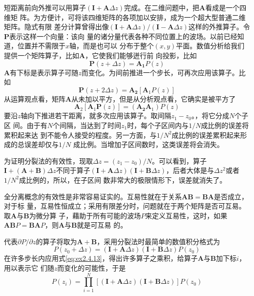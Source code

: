 短距离前向外推可以用算子$(\mathbf{I}+\mathbf{A}\Delta z)$完成。在二维问题中，把$\mathbf{A}$看成是一个四维矩
阵。为方便计，可将该四维矩阵的各项加以安排，成为一个超大型普通二维矩阵。隐式有限
差分计算曾得出像$(\mathbf{I}+\mathbf{A}\Delta z)/(\mathbf{I}-\mathbf{A}\Delta z)$这样的外推算子。令$\mathbf{P}$表示这样一个向量：该向
量的诸分量代表各种不同位置上的波场。以前已经知道，位置并不需限于$x$轴，而是也可以
分布于整个$(x,y)$平面。数值分析给我们提供一个矩阵算子，比如$\mathbf{A}$，它使我们能够迸行前
向投影，比如
\begin{equation*}
\mathbf{P}(z+\Delta z)=\mathbf{A_1}P(z)
\end{equation*}
$\mathbf{A}$有下标是表示算子可随$z$而变化。为间前推进一个步长，可再次应用该算子。比如
\begin{equation*}
\mathbf{P}(z+2\Delta z)=\mathbf{A_2}[\mathbf{A}_1P(z)]
\end{equation*}
从运算观点看，矩阵$\mathbf{A}$从未加以平方，但是从分析观点看，它确实是被平方了
\begin{equation*}
\mathbf{A}_2[\mathbf{A}_1\mathbf{P}(z)]=(\mathbf{A_2}\mathbf{A}_1)P(z)
\end{equation*}
要沿$z$轴向下推进若干距离，就多次应用该算子。取间隔$z_1-z_0$。，将它分成$N$个子区
间。由于有$N$个间隔，当达到了时间$z_1$时，每个子区间内与$1/N$成比例的误差将累积起来达
到不能令人接受的程度。另一方面，与$1/N^2$成比例的误差累积起来形成的总误差却仅与$1/N$
成比例。当增加子区间数时，这类误差将会消失。

为证明分裂法的有效性，现取$\Delta z=(z_1-z_0)/N$。可以看到，算子$\mathbf{I}+(\mathbf{A}+\mathbf{B})\Delta z$不同于算子$(\mathbf{I}+\mathbf{A}\Delta z)(\mathbf{I}+\mathbf{B}\Delta z)$，后者大体是与$\Delta z^2$或者$1/N^2$成比例的，所以，在子区间
数非常大的极限情形下，误差就消失了。

全分离概念的有效性是非常容易证实的。互易性就在于关系$\mathbf{AB}=
\mathbf{BA}$是否成立，对于标
量，互易性恒成立；采用有限差分时，问题就在于两个矩阵是否可互易。取$\mathbf{A}$与$\mathbf{B}$为微分算
子，藉助于所有可能的波场$P$来定义互易性，这时，如果$\mathbf{AB}P=\mathbf{BA}P$，则$\mathbf{A}$与$\mathbf{B}$就是可互易
的。

代表$\partial P/\partial z$的算子将取为$\mathbf{A}+\mathbf{B}$，采用分裂法时最简单的数值积分格式为
\begin{equation}
P(z_0+\Delta z)=(\mathbf{I}+\mathbf{A}\Delta z)(\mathbf{I}+\mathbf{B}\Delta z)P(z_0)
\label{eq:ex2.4.13}
\end{equation}
在许多步长内应用式\ref{eq:ex2.4.13}，得出许多算子之乘积，给算子$\mathbf{A}$与$\mathbf{B}$加下标$i$，用以表示它
们随$z$而变化的可能性，于是
\begin{equation}
P(z_i)=\prod_{i=1}^N[(\mathbf{I}+\mathbf{A}\Delta z)(\mathbf{I}+\mathbf{B}\Delta z)]P(z_0)
\label{eq:ex2.4.14}
\end{equation}
